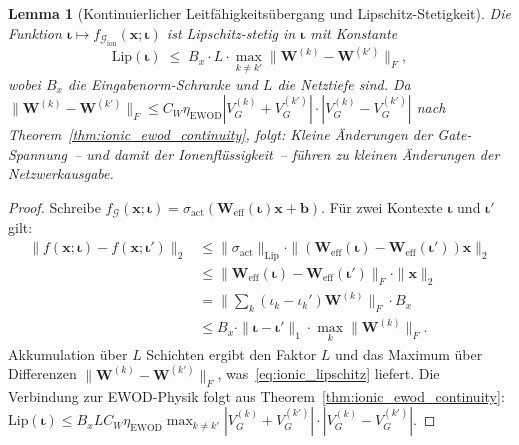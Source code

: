 \documentclass[12pt, a4paper, openany]{report}
\newtheorem{lemma}[theorem]{Lemma}
\newcommand{\calG}{\mathcal{G}}
\begin{document}
\begin{lemma}[Kontinuierlicher Leitfähigkeitsübergang und Lipschitz-Stetigkeit]
\label{lem:ionic_lipschitz}
Die Funktion $\bm{\iota} \mapsto f_{\calG_{\mathrm{ion}}}(\bm{x};\bm{\iota})$
ist Lipschitz-stetig in $\bm{\iota}$ mit Konstante
\begin{equation}
  \label{eq:ionic_lipschitz}
  \mathrm{Lip}(\bm{\iota}) \;\leq\; B_x \cdot L \cdot
  \max_{k \neq k'} \|\bm{W}^{(k)} - \bm{W}^{(k')}\|_F,
\end{equation}
wobei $B_x$ die Eingabenorm-Schranke und $L$ die Netztiefe sind.
Da $\|\bm{W}^{(k)}-\bm{W}^{(k')}\|_F \leq C_W \eta_{\mathrm{EWOD}}
|V_G^{(k)}+V_G^{(k')}|  \cdot |V_G^{(k)}-V_G^{(k')}|$
nach Theorem~\ref{thm:ionic_ewod_continuity}, folgt: Kleine
Änderungen der Gate-Spannung~-- und damit der Ionenflüssigkeit~--
führen zu kleinen Änderungen der Netzwerkausgabe.
\end{lemma}

\begin{proof}
Schreibe $f_{\calG}(\bm{x}; \bm{\iota}) = \sigma_{\mathrm{act}}(\bm{W}_{\mathrm{eff}}(\bm{\iota})\bm{x}
+ \bm{b})$.  Für zwei Kontexte $\bm{\iota}$ und $\bm{\iota}'$ gilt:
\begin{align*}
  \|f(\bm{x};\bm{\iota}) - f(\bm{x};\bm{\iota}')\|_2
  &\leq \|\sigma_{\mathrm{act}}\|_{\mathrm{Lip}} \cdot \|(\bm{W}_{\mathrm{eff}}(\bm{\iota})
    - \bm{W}_{\mathrm{eff}}(\bm{\iota}'))\bm{x}\|_2 \\
  &\leq \|\bm{W}_{\mathrm{eff}}(\bm{\iota}) - \bm{W}_{\mathrm{eff}}(\bm{\iota}')\|_F
    \cdot \|\bm{x}\|_2 \\
  &= \bigl\|\sum_k (\iota_k - \iota_k')\bm{W}^{(k)}\bigr\|_F \cdot B_x \\
  &\leq B_x \cdot \|\bm{\iota} - \bm{\iota}'\|_1 \cdot \max_k \|\bm{W}^{(k)}\|_F.
\end{align*}
Akkumulation über $L$ Schichten ergibt den Faktor $L$ und das Maximum
über Differenzen $\|\bm{W}^{(k)} - \bm{W}^{(k')}\|_F$, was~\eqref{eq:ionic_lipschitz}
liefert.  Die Verbindung zur EWOD-Physik folgt aus
Theorem~\ref{thm:ionic_ewod_continuity}: $\mathrm{Lip}(\bm{\iota}) \leq
B_x L C_W \eta_{\mathrm{EWOD}} \max_{k\neq k'} |V_G^{(k)}+V_G^{(k')}|
\cdot |V_G^{(k)}-V_G^{(k')}|$.
\end{proof}
\end{document}
